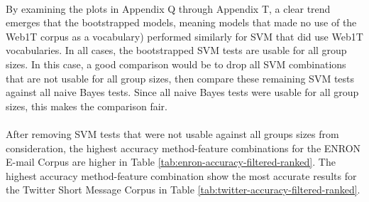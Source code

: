 	\paragraph*{} By examining the plots in Appendix Q through Appendix T, a clear trend emerges that the bootstrapped models, meaning models that made no use of the Web1T corpus as a vocabulary) performed similarly for SVM that did use Web1T vocabularies.  In all cases, the bootstrapped SVM tests are usable for all group sizes.  In this case, a good comparison would be to drop all SVM combinations that are not usable for all group sizes, then compare these remaining SVM tests against all naive Bayes tests.  Since all naive Bayes tests were usable for all group sizes, this makes the comparison fair.
	
	\paragraph*{} After removing SVM tests that were not usable against all groups sizes from consideration, the highest accuracy method-feature combinations for the ENRON E-mail Corpus are higher in Table \ref{tab:enron-accuracy-filtered-ranked}.  The highest accuracy method-feature combination show the most accurate results for the Twitter Short Message Corpus in Table \ref{tab:twitter-accuracy-filtered-ranked}.
	
